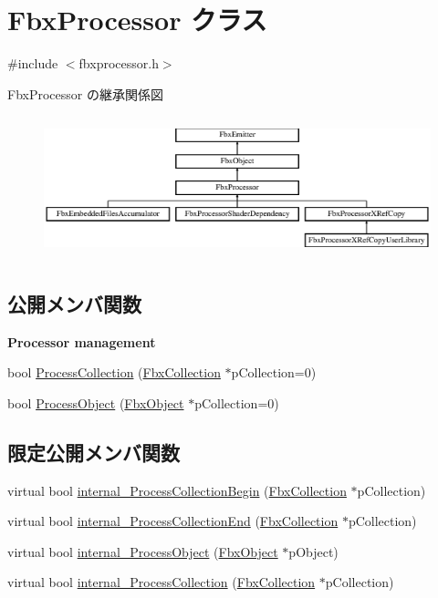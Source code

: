 \hypertarget{class_fbx_processor}{}\section{Fbx\+Processor クラス}
\label{class_fbx_processor}


{\ttfamily \#include $<$fbxprocessor.\+h$>$}

Fbx\+Processor の継承関係図\begin{figure}[H]
\begin{center}
\leavevmode
\includegraphics[height=4.166667cm]{class_fbx_processor}
\end{center}
\end{figure}
\subsection*{公開メンバ関数}
\begin{Indent}\textbf{ Processor management}\par
\begin{DoxyCompactItemize}
\item 
bool \hyperlink{class_fbx_processor_acb7f2a7c80e823b16d2639d7293fefb3}{Process\+Collection} (\hyperlink{class_fbx_collection}{Fbx\+Collection} $\ast$p\+Collection=0)
\item 
bool \hyperlink{class_fbx_processor_adb5587b39465b31d968f1ba7dd2b2d5f}{Process\+Object} (\hyperlink{class_fbx_object}{Fbx\+Object} $\ast$p\+Collection=0)
\end{DoxyCompactItemize}
\end{Indent}
\subsection*{限定公開メンバ関数}
\begin{DoxyCompactItemize}
\item 
virtual bool \hyperlink{class_fbx_processor_aae65d06b0e0f7865eaaa803a4009d536}{internal\+\_\+\+Process\+Collection\+Begin} (\hyperlink{class_fbx_collection}{Fbx\+Collection} $\ast$p\+Collection)
\item 
virtual bool \hyperlink{class_fbx_processor_ae578a3b99db2133b967b0ed29ce37e96}{internal\+\_\+\+Process\+Collection\+End} (\hyperlink{class_fbx_collection}{Fbx\+Collection} $\ast$p\+Collection)
\item 
virtual bool \hyperlink{class_fbx_processor_ac549e7e8c678383831be8789a7c4ccdb}{internal\+\_\+\+Process\+Object} (\hyperlink{class_fbx_object}{Fbx\+Object} $\ast$p\+Object)
\item 
virtual bool \hyperlink{class_fbx_processor_a0b0b24fc89c90b8cc6149df1360fbcbd}{internal\+\_\+\+Process\+Collection} (\hyperlink{class_fbx_collection}{Fbx\+Collection} $\ast$p\+Collection)
\end{DoxyCompactItemize}
